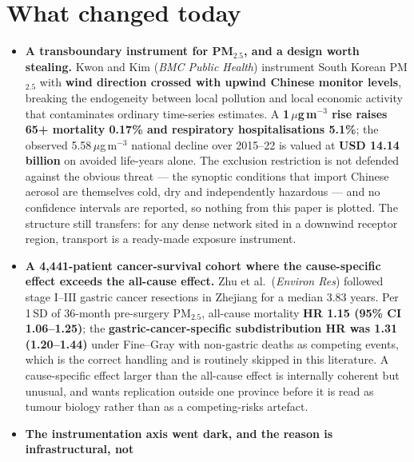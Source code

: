 \documentclass[10pt]{article}
\begin{document}
\vspace{3mm}

\section*{\sffamily\bfseries\color{Deep}What changed today}
\vspace{-1.5mm}{\color{Amber}\rule{\linewidth}{1.1pt}}\vspace{2.5mm}

\footnotesize
\begin{itemize}
\item \textbf{A transboundary instrument for PM$_{2.5}$, and a design worth stealing.}
Kwon and Kim (\textit{BMC Public Health}) instrument South Korean PM$_{2.5}$ with
\textbf{wind direction crossed with upwind Chinese monitor levels}, breaking the
endogeneity between local pollution and local economic activity that contaminates
ordinary time-series estimates. A \textbf{1\,$\mu$g\,m$^{-3}$ rise raises 65+ mortality
0.17\% and respiratory hospitalisations 5.1\%}; the observed 5.58\,$\mu$g\,m$^{-3}$
national decline over 2015--22 is valued at \textbf{USD 14.14 billion} on avoided
life-years alone. The exclusion restriction is not defended against the obvious threat
--- the synoptic conditions that import Chinese aerosol are themselves cold, dry and
independently hazardous --- and no confidence intervals are reported, so nothing from
this paper is plotted. The structure still transfers: for any dense network sited in a
downwind receptor region, transport is a ready-made exposure instrument.
\item \textbf{A 4,441-patient cancer-survival cohort where the cause-specific effect
exceeds the all-cause effect.} Zhu et al.\ (\textit{Environ Res}) followed stage I--III
gastric cancer resections in Zhejiang for a median 3.83 years. Per 1\,SD of 36-month
pre-surgery PM$_{2.5}$, all-cause mortality \textbf{HR 1.15 (95\% CI 1.06--1.25)}; the
\textbf{gastric-cancer-specific subdistribution HR was 1.31 (1.20--1.44)} under Fine--Gray
with non-gastric deaths as competing events, which is the correct handling and is
routinely skipped in this literature. A cause-specific effect larger than the all-cause
effect is internally coherent but unusual, and wants replication outside one province
before it is read as tumour biology rather than as a competing-risks artefact.
\item \textbf{The instrumentation axis went dark, and the reason is infrastructural, not
}
\end{itemize}
\end{document}
